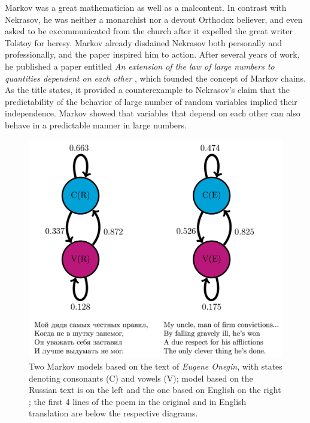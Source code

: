 \documentclass[
  letterpaper,
  DIV=11,
  numbers=noendperiod]{scrreprt}
\begin{document}
Markov was a great mathematician as well as a malcontent. In contrast
with Nekrasov, he was neither a monarchist nor a devout Orthodox
believer, and even asked to be excommunicated from the church after it
expelled the great writer Tolstoy for heresy. Markov already disdained
Nekrasov both personally and professionally, and the paper inspired him
to action. After several years of work, he published a paper entitled
\emph{An extension of the law of large numbers to quantities dependent
on each other} \cite{markov_extension_1906}, which founded the concept
of Markov chains. As the title states, it provided a counterexample to
Nekrasov's claim that the predictability of the behavior of large number
of random variables implied their independence. Markov showed that
variables that depend on each other can also behave in a predictable
manner in large numbers.

\begin{figure}

{\centering \includegraphics{./ch12/onegin_markov_diag.png}

}

\caption{Two Markov models based on the text of \emph{Eugene Onegin},
with states denoting consonants (C) and vowels (V); model based on the
Russian text is on the left and the one based on English on the right
\cite{hayes_first_2012}; the first 4 lines of the poem in the original
\cite{onegin-pushkin} and in English translation \cite{onegin-falen} are
below the respective diagrams.}

\end{figure}
\end{document}
